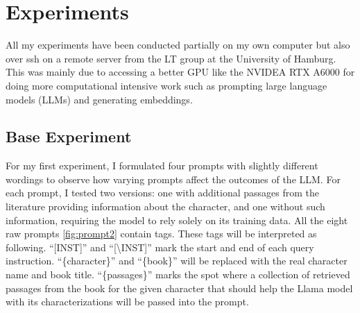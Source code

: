 \chapter{Experiments}

All my experiments have been conducted partially on my own computer but also over ssh on a remote server from the LT group at the University of Hamburg. This was mainly due to accessing a better GPU like the NVIDEA RTX A6000 for doing more computational intensive work such as prompting large language models (LLMs) and generating embeddings.


\section{Base Experiment}

For my first experiment, I formulated four prompts with slightly different wordings to observe how varying prompts affect the outcomes of the LLM. For each prompt, I tested two versions: one with additional passages from the literature providing information about the character, and one without such information, requiring the model to rely solely on its training data. All the eight raw prompts \ref*{fig:prompt2} contain tags. These tags will be interpreted as following. ``[INST]'' and ``[\textbackslash INST]'' mark the start and end of each query instruction. ``\{character\}'' and ``\{book\}'' will be replaced with the real character name and book title. ``\{passages\}'' marks the spot where a collection of retrieved passages from the book for the given character that should help the Llama model with its characterizations will be passed into the prompt.\\


